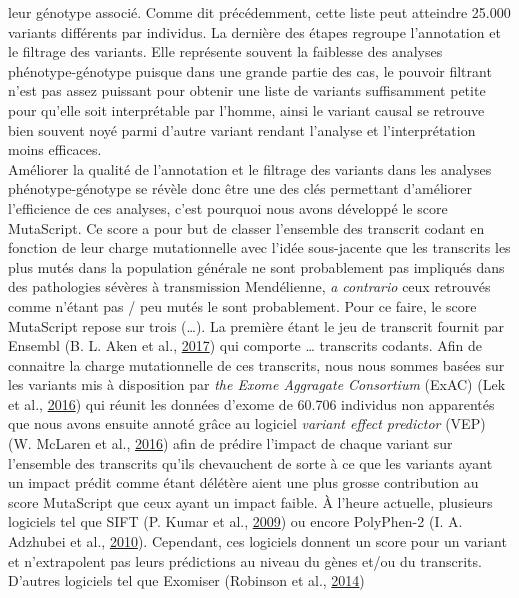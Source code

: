 \documentclass[12pt,twoside]{reedthesis}
\theoremstyle{definition}
\theoremstyle{definition}
\theoremstyle{remark}
\begin{document}
  leur génotype associé. Comme dit précédemment, cette liste peut
  atteindre 25.000 variants différents par individus. La dernière des
  étapes regroupe l'annotation et le filtrage des variants. Elle
  représente souvent la faiblesse des analyses phénotype-génotype puisque
  dans une grande partie des cas, le pouvoir filtrant n'est pas assez
  puissant pour obtenir une liste de variants suffisamment petite pour
  qu'elle soit interprétable par l'homme, ainsi le variant causal se
  retrouve bien souvent noyé parmi d'autre variant rendant l'analyse et
  l'interprétation moins efficaces.\\
  Améliorer la qualité de l'annotation et le filtrage des variants dans
  les analyses phénotype-génotype se révèle donc être une des clés
  permettant d'améliorer l'efficience de ces analyses, c'est pourquoi nous
  avons développé le score MutaScript. Ce score a pour but de classer
  l'ensemble des transcrit codant en fonction de leur charge mutationnelle
  avec l'idée sous-jacente que les transcrits les plus mutés dans la
  population générale ne sont probablement pas impliqués dans des
  pathologies sévères à transmission Mendélienne, \emph{a contrario} ceux
  retrouvés comme n'étant pas / peu mutés le sont probablement. Pour ce
  faire, le score MutaScript repose sur trois (\ldots{}). La première
  étant le jeu de transcrit fournit par Ensembl (B. L. Aken et al.,
  \protect\hyperlink{ref-Aken2017}{2017}) qui comporte \ldots{} transcrits
  codants. Afin de connaitre la charge mutationnelle de ces transcrits,
  nous nous sommes basées sur les variants mis à disposition par \emph{the
  Exome Aggragate Consortium} (ExAC) (Lek et al.,
  \protect\hyperlink{ref-Lek2016}{2016}) qui réunit les données d'exome de
  60.706 individus non apparentés que nous avons ensuite annoté grâce au
  logiciel \emph{variant effect predictor} (VEP) (W. McLaren et al.,
  \protect\hyperlink{ref-McLaren2016}{2016}) afin de prédire l'impact de
  chaque variant sur l'ensemble des transcrits qu'ils chevauchent de sorte
  à ce que les variants ayant un impact prédit comme étant délétère aient
  une plus grosse contribution au score MutaScript que ceux ayant un
  impact faible. À l'heure actuelle, plusieurs logiciels tel que SIFT (P.
  Kumar et al., \protect\hyperlink{ref-Kumar2009}{2009}) ou encore
  PolyPhen-2 (I. A. Adzhubei et al.,
  \protect\hyperlink{ref-Adzhubei2010}{2010}). Cependant, ces logiciels
  donnent un score pour un variant et n'extrapolent pas leurs prédictions
  au niveau du gènes et/ou du transcrits. D'autres logiciels tel que
  Exomiser (Robinson et al., \protect\hyperlink{ref-Robinson2014}{2014})
\end{document}
